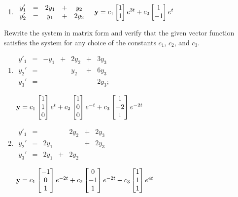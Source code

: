 \documentclass{ximera}
\begin{document}
\begin{problem}
\begin{enumerate}
\item %
 $\begin{array}{ccccc}y'_1&=&2y_1& +&y_2 \\
y_2'&=&y_1 &+& 2y_2\end{array}  \quad
 {\bf y}=c_1\begin{bmatrix}1\\1\end{bmatrix}e^{3t}+c_2\begin{bmatrix}1\\-1\end{bmatrix}e^t$
\end{enumerate}

\end{problem}

\begin{problem}\label{exer:10.2.2}
Rewrite the system in matrix form and
 verify that the given vector function satisfies the  system for
any choice of the constants $c_1$, $c_2$, and $c_3$.

\begin{enumerate}
\item %
 $\begin{array}{ccccccc}y'_1&=&- y_1&+&2y_2& +& 3y_3 \\
y_2'&=&&&y_2 &+& 6y_3\\y_3'&=& && &-&2y_3;\end{array}$

${\bf
y}=c_1\begin{bmatrix}1\\1\\0\end{bmatrix}e^t+c_2\begin{bmatrix}1\\0\\0\end{bmatrix}e^{-t}+c_3\begin{bmatrix}1\\-2\\1\end{bmatrix}e^{-2t}$

\item %
 $\begin{array}{ccccccc}y'_1&=& & &2y_2 &+& 2y_3 \\
y_2'&=&2y_1& & & + &2y_3\\
y_3'&=&2y_1& +&
2y_2& &\end{array}$

${\bf
y}=c_1\begin{bmatrix}-1\\0\\1\end{bmatrix}e^{-2t}+c_2\begin{bmatrix}0\\-1\\1\end{bmatrix}e^{-2t}+c_3\begin{bmatrix}1\\1\\1\end{bmatrix}e^{4t}$


\end{enumerate}
\end{problem}
\end{document}
